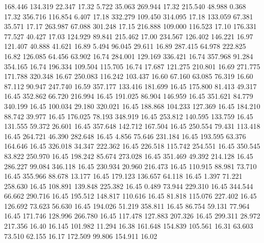  168.446  134.319   22.347        17.32
   5.722   35.063  269.944        17.32
 215.540   48.988    0.368        17.32
 356.716  116.854    6.407        17.18
 332.279  109.450  314.095        17.18
 133.059   67.381   35.571        17.17
 263.987   67.088  301.248        17.15
 216.888  109.000  116.523        17.10
 176.331   77.527   40.427        17.03
 124.929   89.841  215.462        17.00
 234.567  126.402  146.221        16.97
 121.407   40.888   41.621        16.89
   5.494   96.045   29.611        16.89
 287.415   64.978  222.825        16.82
 126.085   64.456   63.902        16.74
 284.001  129.169  336.421        16.74
 357.968   91.284  354.165        16.74
 196.334  109.504  115.705        16.74
  17.687  121.275  210.801        16.69
 271.775  171.788  320.348        16.67
 250.083  116.242  103.437        16.60
  67.160   63.085   76.319        16.60
  87.112   90.947  247.740        16.59
 357.177  133.416  181.699        16.45
 175.800   81.413   49.317        16.45
 352.862   66.720  216.994        16.45
 191.025   86.904  146.959        16.45
 351.621   84.779  340.199        16.45
 100.034   29.180  320.021        16.45
 188.868  104.233  127.369        16.45
 184.210   88.742   39.977        16.45
 176.025   78.193  348.919        16.45
 253.812  140.595  133.759        16.45
 131.555   59.372   26.601        16.45
 357.648  142.712  167.504        16.45
 250.554   79.431  113.418        16.45
 264.721   46.390  282.648        16.45
   4.856   75.646  231.184        16.45
 193.595   63.376  164.646        16.45
 326.018   34.347  222.362        16.45
 226.518  115.742  254.551        16.45
 350.545   83.822  250.970        16.45
 198.242   85.674  273.028        16.45
 351.469   49.392  214.128        16.45
 286.227   99.084  346.118        16.45
 230.934   20.960  216.473        16.45
 110.915   88.981   73.710        16.45
 355.966   88.678   13.177        16.45
 179.123  136.657   64.118        16.45
   1.397   71.221  258.630        16.45
 108.891  139.848  225.382        16.45
   0.489   73.944  229.310        16.45
 344.544   66.662  290.716        16.45
 195.512  148.817  110.616        16.45
  81.818  115.076  227.402        16.45
 126.692   73.623   56.630        16.45
 194.026   51.219  358.811        16.45
  86.754   59.131   77.964        16.45
 171.746  128.996  266.780        16.45
 117.478  127.883  207.326        16.45
 299.311   28.972  217.356        16.40
  16.145  101.982   11.294        16.38
 161.648  154.839  105.561        16.31
  63.603   73.510   62.155        16.17
 172.509   99.806  154.911        16.02
